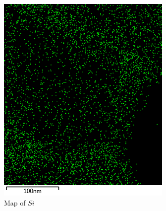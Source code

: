 \documentclass[12pt,a4paper]{article}
\begin{document}
\begin{figure}[htbp]
  \begin{subfigure}[b]{0.35\textwidth}
    \includegraphics[width=\textwidth]{Data/Si Map.png}
    \caption{Map of $Si$}
    \label{fig:si_map}
  \end{subfigure}
  \begin{subfigure}[b]{0.35\textwidth}

\end{subfigure}
\end{figure}
\end{document}
